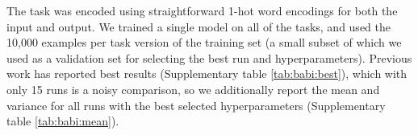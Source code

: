 \documentclass{article}
\begin{document}
The task was encoded using straightforward 1-hot word encodings for both the input and output. We trained a single model on all of the tasks, and used the 10,000 examples per task version of the training set (a small subset of which we used as a validation set for selecting the best run and hyperparameters). Previous work has reported best results (Supplementary table \ref{tab:babi:best}), which with only 15 runs is a noisy comparison, so we additionally report the mean and variance for all runs with the best selected hyperparameters (Supplementary table \ref{tab:babi:mean}).

\begin{landscape}

\begin{table}[]
    \centering
    \begin{tabular}{l|c|c|c|c|c|c|c|c}


\end{tabular}
\end{table}
\end{landscape}
\end{document}
